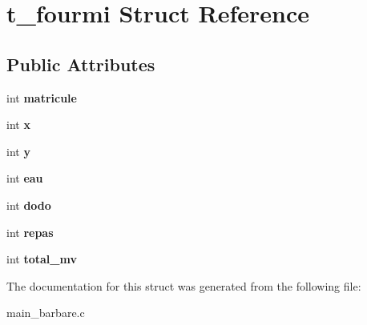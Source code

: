 \hypertarget{structt__fourmi}{\section{t\+\_\+fourmi Struct Reference}
\label{structt__fourmi}
}
\subsection*{Public Attributes}
\begin{DoxyCompactItemize}
\item 
\hypertarget{structt__fourmi_ab45e723a7a11d7789888a5ee574c6bc9}{int {\bfseries matricule}}\label{structt__fourmi_ab45e723a7a11d7789888a5ee574c6bc9}

\item 
\hypertarget{structt__fourmi_a258cf4f2243aad27ab01dc55bb701078}{int {\bfseries x}}\label{structt__fourmi_a258cf4f2243aad27ab01dc55bb701078}

\item 
\hypertarget{structt__fourmi_aa9fe73b8d3d492ce6cf3985e4910fdf2}{int {\bfseries y}}\label{structt__fourmi_aa9fe73b8d3d492ce6cf3985e4910fdf2}

\item 
\hypertarget{structt__fourmi_a757c3ee4ea2dcbf825cd93f6b8bf0ef8}{int {\bfseries eau}}\label{structt__fourmi_a757c3ee4ea2dcbf825cd93f6b8bf0ef8}

\item 
\hypertarget{structt__fourmi_a0a2a75c5a649f263d4e299a488edfe4f}{int {\bfseries dodo}}\label{structt__fourmi_a0a2a75c5a649f263d4e299a488edfe4f}

\item 
\hypertarget{structt__fourmi_a5ba7caca7f8cf1e8195ceae92cdaca00}{int {\bfseries repas}}\label{structt__fourmi_a5ba7caca7f8cf1e8195ceae92cdaca00}

\item 
\hypertarget{structt__fourmi_a81345593813fffd4760b20bc55392190}{int {\bfseries total\+\_\+mv}}\label{structt__fourmi_a81345593813fffd4760b20bc55392190}

\end{DoxyCompactItemize}


The documentation for this struct was generated from the following file\+:\begin{DoxyCompactItemize}
\item 
main\+\_\+barbare.\+c\end{DoxyCompactItemize}
